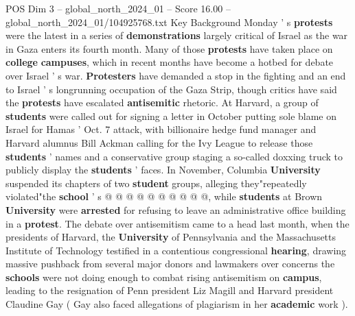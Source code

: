 \begin{textsample}{POS Dim 3 – global\_north\_2024\_01 – Score 16.00 – global\_north\_2024\_01/104925768.txt}
Key Background Monday ' s \textbf{protests} were the latest in a series of \textbf{demonstrations} largely critical of Israel as the war in Gaza enters its fourth month.
Many of those \textbf{protests} have taken place on \textbf{college} \textbf{campuses}, which in recent months have become a hotbed for debate over Israel ' s war. \textbf{Protesters} have demanded a stop in the fighting and an end to Israel ' s longrunning occupation of the Gaza Strip, though critics have said the \textbf{protests} have escalated \textbf{antisemitic} rhetoric.
At Harvard, a group of \textbf{students} were called out for signing a letter in October putting sole blame on Israel for Hamas ' Oct. 7 attack, with billionaire hedge fund manager and Harvard alumnus Bill Ackman calling for the Ivy League to release those \textbf{students} ' names and a conservative group staging a so-called doxxing truck to publicly display the \textbf{students} ' faces.
In November, Columbia \textbf{University} suspended its chapters of two \textbf{student} groups, alleging they"repeatedly violated"the \textbf{school} ' s @ @ @ @ @ @ @ @ @ @, while \textbf{students} at Brown \textbf{University} were \textbf{arrested} for refusing to leave an administrative office building in a \textbf{protest}.
The debate over antisemitism came to a head last month, when the presidents of Harvard, the \textbf{University} of Pennsylvania and the Massachusetts Institute of Technology testified in a contentious congressional \textbf{hearing}, drawing massive pushback from several major donors and lawmakers over concerns the \textbf{schools} were not doing enough to combat rising antisemitism on \textbf{campus}, leading to the resignation of Penn president Liz Magill and Harvard president Claudine Gay ( Gay also faced allegations of plagiarism in her \textbf{academic} work ).

\end{textsample}
